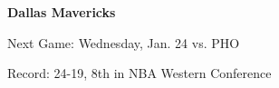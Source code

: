 
\textbf{Dallas Mavericks}

Next Game: Wednesday, Jan. 24 vs. PHO

Record: 24-19, 8th in NBA Western Conference
